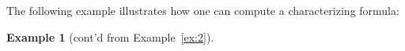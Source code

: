 \documentclass{article}
\newtheorem{example}{Example}
\begin{document}
The following example illustrates how one can compute a characterizing formula:
\begin{example}[cont'd from Example~\ref{ex:2}]\label{ex:4}


\end{example}
\end{document}
